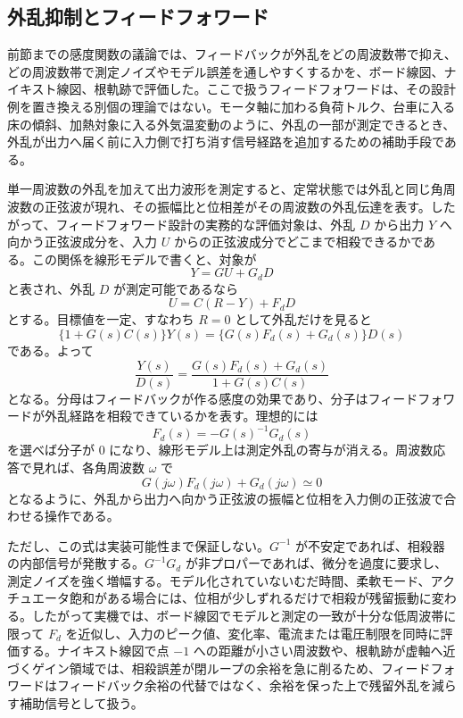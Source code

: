 \subsection{外乱抑制とフィードフォワード}

前節までの感度関数の議論では、フィードバックが外乱をどの周波数帯で抑え、どの周波数帯で測定ノイズやモデル誤差を通しやすくするかを、ボード線図、ナイキスト線図、根軌跡で評価した。ここで扱うフィードフォワードは、その設計例を置き換える別個の理論ではない。モータ軸に加わる負荷トルク、台車に入る床の傾斜、加熱対象に入る外気温変動のように、外乱の一部が測定できるとき、外乱が出力へ届く前に入力側で打ち消す信号経路を追加するための補助手段である。

単一周波数の外乱を加えて出力波形を測定すると、定常状態では外乱と同じ角周波数の正弦波が現れ、その振幅比と位相差がその周波数の外乱伝達を表す。したがって、フィードフォワード設計の実務的な評価対象は、外乱 $D$ から出力 $Y$ へ向かう正弦波成分を、入力 $U$ からの正弦波成分でどこまで相殺できるかである。この関係を線形モデルで書くと、対象が
\begin{equation}
  Y=G U+G_dD
\end{equation}
と表され、外乱 $D$ が測定可能であるなら
\begin{equation}
  U=C(R-Y)+F_dD
\end{equation}
とする。目標値を一定、すなわち $R=0$ として外乱だけを見ると
\begin{equation}
  \{1+G(s)C(s)\}Y(s)=\{G(s)F_d(s)+G_d(s)\}D(s)
\end{equation}
である。よって
\begin{equation}
  \frac{Y(s)}{D(s)}
  =
  \frac{G(s)F_d(s)+G_d(s)}{1+G(s)C(s)}
\end{equation}
となる。分母はフィードバックが作る感度の効果であり、分子はフィードフォワードが外乱経路を相殺できているかを表す。理想的には
\begin{equation}
  F_d(s)=-G(s)^{-1}G_d(s)
\end{equation}
を選べば分子が 0 になり、線形モデル上は測定外乱の寄与が消える。周波数応答で見れば、各角周波数 $\omega$ で
\begin{equation}
  G(j\omega)F_d(j\omega)+G_d(j\omega)\simeq0
\end{equation}
となるように、外乱から出力へ向かう正弦波の振幅と位相を入力側の正弦波で合わせる操作である。

ただし、この式は実装可能性まで保証しない。$G^{-1}$ が不安定であれば、相殺器の内部信号が発散する。$G^{-1}G_d$ が非プロパーであれば、微分を過度に要求し、測定ノイズを強く増幅する。モデル化されていないむだ時間、柔軟モード、アクチュエータ飽和がある場合には、位相が少しずれるだけで相殺が残留振動に変わる。したがって実機では、ボード線図でモデルと測定の一致が十分な低周波帯に限って $F_d$ を近似し、入力のピーク値、変化率、電流または電圧制限を同時に評価する。ナイキスト線図で点 $-1$ への距離が小さい周波数や、根軌跡が虚軸へ近づくゲイン領域では、相殺誤差が閉ループの余裕を急に削るため、フィードフォワードはフィードバック余裕の代替ではなく、余裕を保った上で残留外乱を減らす補助信号として扱う。

